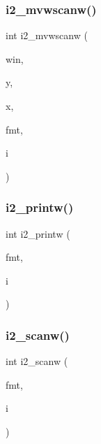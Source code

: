 \mbox{\label{C-macros_8c_aa6f3d74bf85893265213c40cb5b732e6}} 
\subsubsection{\texorpdfstring{i2\+\_\+mvwscanw()}{i2\_mvwscanw()}}
{\footnotesize\ttfamily int i2\+\_\+mvwscanw (\begin{DoxyParamCaption}\item[{W\+I\+N\+D\+OW $\ast$}]{win,  }\item[{int}]{y,  }\item[{int}]{x,  }\item[{char $\ast$}]{fmt,  }\item[{short $\ast$}]{i }\end{DoxyParamCaption})}

\mbox{\label{C-macros_8c_af9bd28267a2b2f23bc7f8e1a3c9a88f7}} 
\subsubsection{\texorpdfstring{i2\+\_\+printw()}{i2\_printw()}}
{\footnotesize\ttfamily int i2\+\_\+printw (\begin{DoxyParamCaption}\item[{const char $\ast$}]{fmt,  }\item[{short}]{i }\end{DoxyParamCaption})}

\mbox{\label{C-macros_8c_ad51e0ab478b4039b3191e38e31ee0676}} 
\subsubsection{\texorpdfstring{i2\+\_\+scanw()}{i2\_scanw()}}
{\footnotesize\ttfamily int i2\+\_\+scanw (\begin{DoxyParamCaption}\item[{char $\ast$}]{fmt,  }\item[{short $\ast$}]{i }\end{DoxyParamCaption})}

